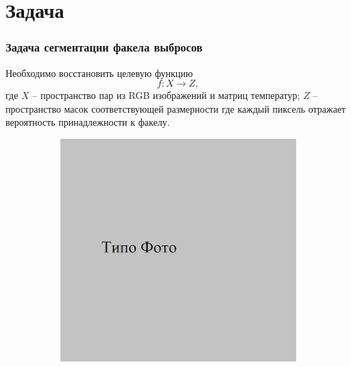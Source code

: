 \documentclass[t]{beamer}
\begin{document}
\section{Задача}

	\begin{frame}
		\frametitle{Задача сегментации факела выбросов} 
		\vspace*{-0.3cm}
		Необходимо восстановить целевую функцию
		\begin{equation}
			f: X \rightarrow Z,
			\label{eq:segment_func}
		\end{equation}
	где $X$ -- пространство пар из RGB изображений и матриц температур;
	$Z$ -- пространство масок соответствующей размерности где каждый пиксель отражает вероятность принадлежности к факелу.
	\begin{figure}[ht!]
		\begin{subfigure}{.25\textwidth}
			\centering
			\includegraphics[width = \textwidth]{image/opt_examp}
			\caption{}
		\end{subfigure}
		\begin{subfigure}{.25\textwidth}
			\centering

\end{subfigure}
\end{figure}
\end{frame}
\end{document}
